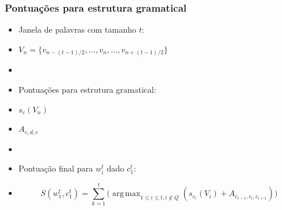 \documentclass[10pt]{beamer}
\DeclareMathOperator*{\argmax}{arg\,max}
\begin{document}
\begin{frame}[fragile]
\frametitle{Pontuações para estrutura gramatical}


  \begin{itemize}

    \item[-] Janela de palavras com tamanho $t$:

    \item[\ ] $V_n = \big\{ v_{n - (t-1)/2}, ..., v_n, ..., v_{{n + (t-1)/2}} \big\} $

    \item[\ ] \ 

    \item[-] Pontuações para estrutura gramatical:

    \item[\ ] $s_c(V_n)$

    \item[\ ] $A_{c,d,e}$

    \item[\ ] \ 

    \item[-] Pontuação final para $w_i^t$ dado $c_1^t$:

    \item[\ ] \begin{equation} 
S(w_1^t, c_1^t) = \sum\limits_{k=1}^{t} \Big( \argmax_{1 \leq i \leq t, i \notin Q} (s_{c_i}(V_i) + A_{c_{i-1}, c_{i}, c_{i+1}}) \Big) \nonumber
\end{equation}



  \end{itemize}

\end{frame}
\end{document}

